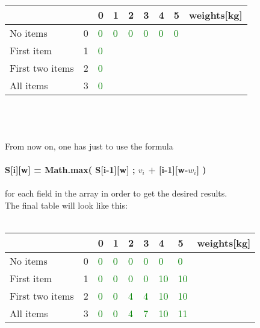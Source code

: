 \begin{tabular}{l|l|l|l|l|l|l|l|l}
                &   & 0 & 1 & 2 & 3 & 4 & 5 & weights{[}kg{]} \\ \hline
No items        & 0 & \textcolor{green}{0}  & \textcolor{green}{0}  & \textcolor{green}{0}  & \textcolor{green}{0}  & \textcolor{green}{0}  & \textcolor{green}{0}  &                 \\
First item      & 1 & \textcolor{green}{0}  &   &   &   &   &   &                 \\
First two items & 2 & \textcolor{green}{0}  &   &   &   &   &   &                 \\
All items       & 3 & \textcolor{green}{0}  &   &   &   &   &   &                
\end{tabular}\\\\\\
From now on, one has just to use the formula \\\\ \textbf{S[i][w] = Math.max( S[i-1][w] ; $v_i$ + [i-1][w-$w_i$] )} \\\\
for each field in the array in order to get the desired results.\\
The final table will look like this:\\\\
\begin{tabular}{l|l|l|l|l|l|l|l|l}
                &   & 0 & 1 & 2 & 3 & 4 & 5 & weights{[}kg{]} \\ \hline
No items        & 0 & \textcolor{green}{0}  & \textcolor{green}{0}  & \textcolor{green}{0}  & \textcolor{green}{0}  & \textcolor{green}{0}  & \textcolor{green}{0}  &                 \\
First item      & 1 & \textcolor{green}{0}  & \textcolor{green}{0}  & \textcolor{green}{0}  & \textcolor{green}{0}  & \textcolor{green}{10}  & \textcolor{green}{10}  &                 \\
First two items & 2 & \textcolor{green}{0}  & \textcolor{green}{0}   & \textcolor{green}{4}  & \textcolor{green}{4} & \textcolor{green}{10}  & \textcolor{green}{10}  &                 \\
All items       & 3 & \textcolor{green}{0}  & \textcolor{green}{0}   & \textcolor{green}{4}  & \textcolor{green}{7} & \textcolor{green}{10}  & \textcolor{green}{11}  &                
\end{tabular}\\\\\\
